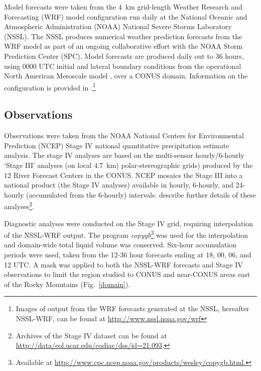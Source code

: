 Model forecasts were taken from the \mbox{4 km} grid-length Weather Research and Forecasting (WRF) model configuration \citep{WRFV3} run daily at the National Oceanic and Atmospheric Administration (NOAA) National Severe Storms Laboratory (NSSL).
The NSSL produces numerical weather prediction forecasts from the WRF model as part of an ongoing collaborative effort with the NOAA Storm Prediction Center (SPC).
Model forecasts are produced daily out to 36 hours, using 0000 UTC initial and lateral boundary conditions from the operational North American Mesoscale model \citep{NAM}, over a CONUS domain.
Information on the configuration is provided in \cite{Kain2010}.\footnote{Images of output from the WRF forecasts generated at the NSSL, hereafter NSSL-WRF, can be found at \url{http://www.nssl.noaa.gov/wrf}}




\subsection{Observations}
\label{observations}

Observations were taken from the NOAA National Centers for Environmental Prediction (NCEP) Stage IV national quantitative precipitation estimate analysis.
The stage IV analyses are based on the multi-sensor hourly/6-hourly `Stage III' analyses (on local \mbox{4.7 km}) polar-stereographic grids) produced by the 12 River Forecast Centers in the CONUS.
NCEP mosaics the Stage III into a national product (the Stage IV analyses) available in hourly, 6-hourly, and 24-hourly (accumulated from the 6-hourly) intervals.
\cite{StageIV} describe further details of these analyses\footnote{Archives of the Stage IV dataset can be found at \url{http://data/eol.ucar.edu/codiac/dss/id=21.093}.}.

Diagnostic analyses were conducted on the Stage IV grid, requiring interpolation of the NSSL-WRF output.
The program \emph{copygb}\footnote{Available at \url{http://www.cpc.ncep.noaa.gov/products/wesley/copygb.html.}} was used for the interpolation and domain-wide total liquid volume was conserved.
Six-hour accumulation periods were used, taken from the 12-36 hour forecasts ending at 18, 00, 06, and 12 UTC.
A mask was applied to both the NSSL-WRF forecasts and Stage IV observations to limit the region studied to CONUS and near-CONUS areas east of the Rocky Mountains \mbox{(Fig. \ref{domain})}.


